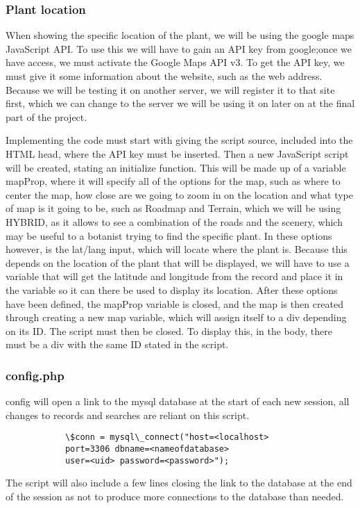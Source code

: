 	\subsubsection{Plant location}
		When showing the specific location of the plant, we will be using the google maps JavaScript API. To use this we will have to gain an API key from google;once we have access, we must activate the Google Maps API v3. To get the API key, we must give it some information about the website, such as the web address. Because we will be testing it on another server, we will register it to that site first, which we can change to the server we will be using it on later on at the final part of the project.
	
		Implementing the code must start with giving the script source, included into the HTML head, where the API key must be inserted.  Then a new JavaScript script will be created, stating an initialize function. This will be made up of a variable mapProp, where it will specify all of the options for the map, such as where to center the map, how close are we going to zoom in on the location and what type of map is it going to be, such as Roadmap and Terrain, which we will be using HYBRID, as it allows to see a combination of the roads and the scenery, which may be useful to a botanist trying to find the specific plant. In these options however, is the lat/lang input, which will locate where the plant is. Because this depends on the location of the plant that will be displayed, we will have to use a variable that will get the latitude and longitude from the record and place it in the variable so it can there be used to display its location. After these options have been defined, the mapProp variable is closed, and the map is then created through creating a new map variable, which will assign itself to a div depending on its ID. The script must then be closed. To display this, in the body, there must be a div with the same ID stated in the script. 

	\subsubsection{config.php}
		config will open a link to the mysql database at the start of each new session, all changes to records and searches are reliant on this script.
		\begin{verbatim}
			\$conn = mysql\_connect("host=<localhost>
			port=3306 dbname=<nameofdatabase> 
			user=<uid> password=<password>");
		\end{verbatim}
		The script will also include a few lines closing the link to the database at the end of the session as not to produce more connections to the database than needed.

